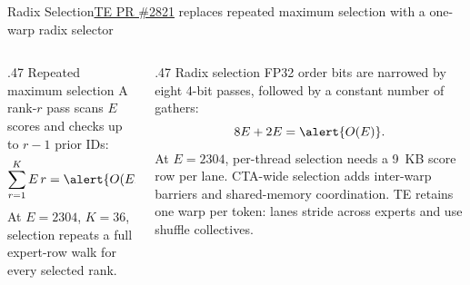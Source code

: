 \documentclass[aspectratio=169,10pt]{beamer}
\renewcommand{\NvidiaSource}[1]{}
\begin{document}
\begin{frame}[shrink=5]{Radix Selection}{\href{https://github.com/NVIDIA/TransformerEngine/pull/2821}{TE PR \#2821} replaces repeated maximum selection with a one-warp radix selector}
  \NvidiaSource{\href{https://github.com/NVIDIA/TransformerEngine/pull/2821}{TE PR \#2821};
    \texttt{TE/.../fused\_router/utils.h}}
  \begin{columns}[T,onlytextwidth]
    \begin{column}{.47\textwidth}
      {\NvidiaSansMedium Repeated maximum selection}\NvidiaTightRule{.6pt}\vspace{.08in}
      \small A rank-$r$ pass scans $E$ scores and checks up to $r-1$ prior IDs:
      \[
        \sum_{r=1}^{K} E\,r = \alert{O(EK^2)}.
      \]
      \vspace{.05in}
      \small At $E=2304$, $K=36$, selection repeats a full expert-row walk for every
      selected rank.
    \end{column}
    \begin{column}{.47\textwidth}
      {\NvidiaSansMedium Radix selection}\NvidiaTightRule{.6pt}\vspace{.08in}
      \small FP32 order bits are narrowed by eight 4-bit passes, followed by a constant
      number of gathers:
      \[
        8E + 2E = \alert{O(E)}.
      \]
      \vspace{.05in}
      \fontsize{8.5}{10}\selectfont At $E=2304$, per-thread selection needs a 9~KB score row
      per lane. CTA-wide selection adds inter-warp barriers and shared-memory coordination. TE
      retains one warp per token: lanes stride across experts and use shuffle collectives.
    \end{column}
  \end{columns}
  \vspace{.02in}
  \noindent{}\hfill
  \hfill
\end{frame}
\end{document}
